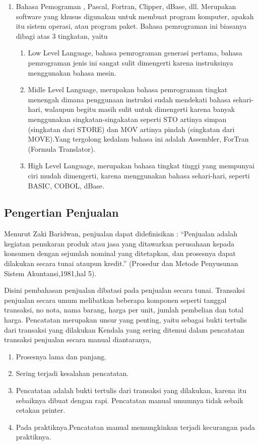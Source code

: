 \documentclass{article}
\begin{document}
\begin{enumerate}
    \item Bahasa Pemograman
    , Pascal, Fortran, Clipper, dBase, dll. Merupakan software yang khusus digunakan untuk membuat program komputer, apakah itu sistem operasi, atau program paket. Bahasa pemrograman ini biasanya dibagi atas 3 tingkatan, yaitu 
    \begin{enumerate}
        \item Low Level Language, bahasa pemrograman generasi pertama, bahasa pemrograman jenis ini sangat sulit dimengerti karena instruksinya menggunakan bahasa mesin. 
        \item Midle Level Language, merupakan bahasa pemrograman tingkat menengah dimana penggunaan instruksi sudah mendekati bahasa sehari-hari, walaupun begitu masih sulit untuk dimengerti karena banyak menggunakan singkatan-singakatan seperti STO artinya simpan (singkatan dari STORE) dan MOV artinya pindah (singkatan dari MOVE).Yang tergolong kedalam bahasa ini adalah Assembler, ForTran (Formula Translator).
        \item High Level Language, merupakan bahasa tingkat tinggi yang mempunyai ciri mudah dimengerti, karena menggunakan bahasa sehari-hari, seperti BASIC, COBOL, dBase.
    \end{enumerate}
\end{enumerate}

\subsection{Pengertian Penjualan}
Menurut Zaki Baridwan, penjualan dapat didefinisikan : “Penjualan adalah kegiatan penukaran produk atau jasa yang ditawarkan perusahaan kepada konsumen dengan sejumlah nominal yang ditetapkan, dan prosesnya dapat dilakukan secara tunai ataupun kredit.” (Prosedur dan Metode Penyusunan Sistem Akuntansi,1981,hal 5).

Disini pembahasan penjualan dibatasi pada penjualan secara tunai. Transaksi penjualan secara umum melibatkan beberapa komponen seperti tanggal transaksi, no nota, nama barang, harga per unit, jumlah pembelian dan total harga. Pencatatan merupakan unsur yang penting, yaitu sebagai bukti tertulis dari transaksi yang dilakukan Kendala yang sering ditemui dalam pencatatan transaksi penjualan secara manual diantaranya,
\begin{enumerate}
    \item Prosesnya lama dan panjang.
    \item Sering terjadi kesalahan pencatatan.
    \item Pencatatan adalah bukti tertulis dari transaksi yang dilakukan, karena itu sebaiknya dibuat dengan rapi. Pencatatan manual umumnya tidak sebaik cetakan printer.
    \item Pada praktiknya.Pencatatan manual memungkinkan terjadi kecurangan pada praktiknya.
\end{enumerate}
\end{document}
